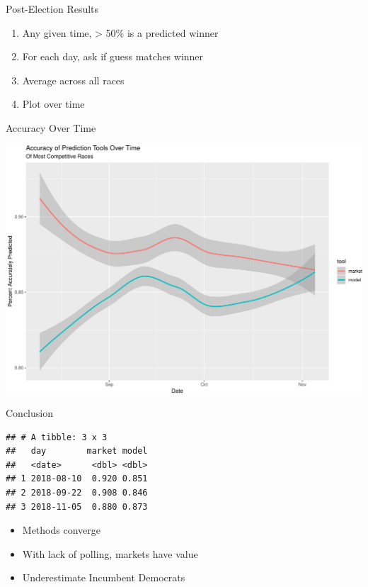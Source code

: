 \documentclass[ignorenonframetext,]{beamer}
\providecommand{\tightlist}{%
  \setlength{\itemsep}{0pt}\setlength{\parskip}{0pt}}
\begin{document}
\begin{frame}{Post-Election Results}

\begin{enumerate}
\def\labelenumi{\arabic{enumi}.}
\tightlist
\item
  Any given time, \textgreater{} 50\% is a predicted winner
\item
  For each day, ask if guess matches winner
\item
  Average across all races
\item
  Plot over time
\end{enumerate}

\end{frame}

\begin{frame}{Accuracy Over Time}

\includegraphics{markets_models_files/figure-beamer/accuracy-1.pdf}

\end{frame}

\begin{frame}[fragile]{Conclusion}

\begin{verbatim}
## # A tibble: 3 x 3
##   day        market model
##   <date>      <dbl> <dbl>
## 1 2018-08-10  0.920 0.851
## 2 2018-09-22  0.908 0.846
## 3 2018-11-05  0.880 0.873
\end{verbatim}

\begin{itemize}
\tightlist
\item
  Methods converge
\item
  With lack of polling, markets have value
\item
  Underestimate Incumbent Democrats
\end{itemize}

\end{frame}
\end{document}
